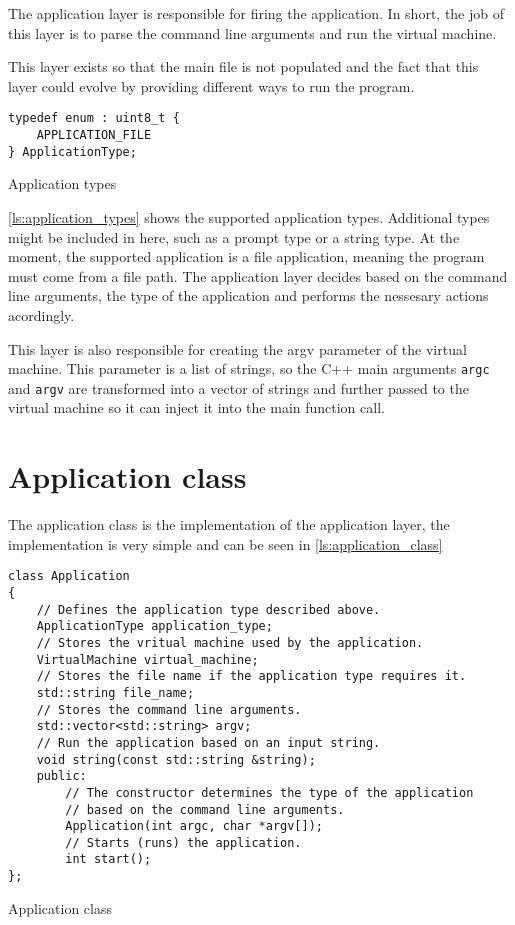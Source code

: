 The application layer is responsible for firing the application. In short, the job
of this layer is to parse the command line arguments and run the virtual machine.

This layer exists so that the main file is not populated and the fact that this layer could evolve by providing different ways to run
the program.

\begin{listing}[H]
\begin{verbatim}
typedef enum : uint8_t {
    APPLICATION_FILE
} ApplicationType;
\end{verbatim}
\caption{Application types}
\label{ls:application_types}
\end{listing}

\autoref{ls:application_types} shows the supported application types. Additional types might be included in here, such as a prompt type or a string type.
At the moment, the supported application is a file application, meaning the program must come from a file path.
The application layer decides based on the command line arguments, the type of the application and performs the nessesary actions acordingly.

This layer is also responsible for creating the argv parameter of the virtual machine. This parameter is a list of strings, so the C++ main arguments
\texttt{argc} and \texttt{argv} are transformed into a vector of strings and further passed to the virtual machine so it can inject it into the
main function call.

\section{Application class}

The application class is the implementation of the application layer, the implementation is very simple and can be seen in \autoref{ls:application_class}

\begin{listing}[H]
\begin{verbatim}
class Application
{
    // Defines the application type described above.
    ApplicationType application_type;
    // Stores the vritual machine used by the application.
    VirtualMachine virtual_machine;
    // Stores the file name if the application type requires it.
    std::string file_name;
    // Stores the command line arguments.
    std::vector<std::string> argv;
    // Run the application based on an input string.
    void string(const std::string &string);
    public:
        // The constructor determines the type of the application
        // based on the command line arguments.
        Application(int argc, char *argv[]);
        // Starts (runs) the application.
        int start();
};
\end{verbatim}
\caption{Application class}
\label{ls:application_class}
\end{listing}
